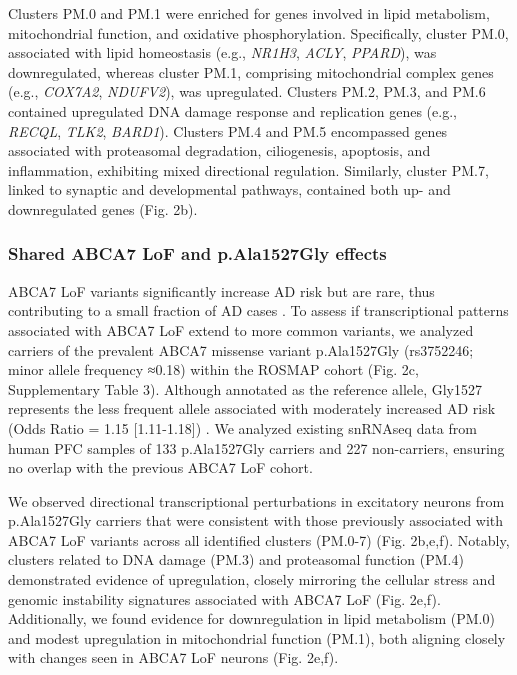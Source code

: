 Clusters PM.0 and PM.1 were enriched for genes involved in lipid metabolism, mitochondrial function, and oxidative phosphorylation. Specifically, cluster PM.0, associated with lipid homeostasis (e.g., \textit{NR1H3}, \textit{ACLY}, \textit{PPARD}), was downregulated, whereas cluster PM.1, comprising mitochondrial complex genes (e.g., \textit{COX7A2}, \textit{NDUFV2}), was upregulated. Clusters PM.2, PM.3, and PM.6 contained upregulated DNA damage response and replication genes (e.g., \textit{RECQL}, \textit{TLK2}, \textit{BARD1}). Clusters PM.4 and PM.5 encompassed genes associated with proteasomal degradation, ciliogenesis, apoptosis, and inflammation, exhibiting mixed directional regulation. Similarly, cluster PM.7, linked to synaptic and developmental pathways, contained both up- and downregulated genes (Fig. 2b).

\subsubsection{Shared ABCA7 LoF and p.Ala1527Gly effects}
ABCA7 LoF variants significantly increase AD risk but are rare, thus contributing to a small fraction of AD cases \supercite{Steinberg2015-mu,Duchateau2024-rf}. To assess if transcriptional patterns associated with ABCA7 LoF extend to more common variants, we analyzed carriers of the prevalent ABCA7 missense variant p.Ala1527Gly (rs3752246; minor allele frequency ≈0.18) within the ROSMAP cohort (Fig. 2c, Supplementary Table 3). Although annotated as the reference allele, Gly1527 represents the less frequent allele associated with moderately increased AD risk (Odds Ratio = 1.15 [1.11-1.18]) \supercite{Kunkle2019-yo,Holstege2022-vp,Naj2011-bs}. We analyzed existing snRNAseq data \supercite{Mathys2023-rs} from human PFC samples of 133 p.Ala1527Gly carriers and 227 non-carriers, ensuring no overlap with the previous ABCA7 LoF cohort.

We observed directional transcriptional perturbations in excitatory neurons from p.Ala1527Gly carriers that were consistent with those previously associated with ABCA7 LoF variants across all identified clusters (PM.0-7) (Fig. 2b,e,f). Notably, clusters related to DNA damage (PM.3) and proteasomal function (PM.4) demonstrated evidence of upregulation, closely mirroring the cellular stress and genomic instability signatures associated with ABCA7 LoF (Fig. 2e,f). Additionally, we found evidence for downregulation in lipid metabolism (PM.0) and modest upregulation in mitochondrial function (PM.1), both aligning closely with changes seen in ABCA7 LoF neurons (Fig. 2e,f).

